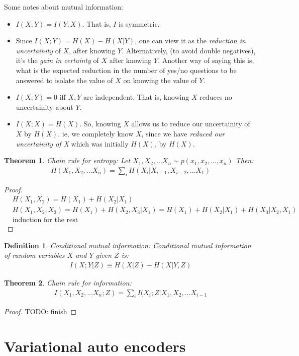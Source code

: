 \documentclass[11pt]{book}
\renewcommand{\H}{\ensuremath{H}}
\newcommand{\I}{\ensuremath{I}}
\newtheorem{theorem}{Theorem}
\newtheorem{definition}{Definition}
\newtheorem{proof}{Proof}
\begin{document}
Some notes about mutual information:
\begin{itemize}
    \item $I(X; Y) = I(Y;X)$. That is, $I$ is symmetric.

    \item Since $I(X;Y) = H(X) - H(X|Y)$, one can view it as the 
         \textit{reduction in uncertainity} of $X$, after knowing $Y$. 
         Alternatively, (to avoid double negatives), it's the \textit{gain in
         certainty} of $X$ after knowing $Y$.  Another way of saying this is,
         what is the expected reduction in the number of yes/no questions to be
         answered to isolate the value of $X$ on knowing the value of $Y$.

    \item $I(X;Y) = 0$ iff $X, Y$ are independent. That is, knowing $X$ reduces
        no uncertainity about $Y$.

    \item $I(X;X) = H(X)$. So, knowing $X$ allows us to reduce our uncertainity
        of $X$ by $H(X)$. ie, we completely know $X$, since we have
        \textit{reduced our uncertainity of X} which was initially $H(X)$, by $H(X)$.

\end{itemize}

\begin{theorem}
    Chain rule for entropy: Let $X_1, X_2, \dots X_n \sim p(x_1, x_2, \dots, x_n)$
    Then:
    \begin{align*}
        \H(X_1, X_2, \dots X_n) = \sum_i \H(X_i | X_{i-1}, X_{i-2}, \dots X_1)
    \end{align*}
\end{theorem}
\begin{proof}
    \begin{align*}
    &\H(X_1, X_2) = \H(X_1) + \H(X_2 | X_1) \\
    &\H(X_1, X_2, X_3) = \H(X_1) + \H(X_2, X_3 | X_1) = \H(X_1) + H(X_2 | X_1) + H(X_3 | X_2, X_1) \\
    &\text{induction for the rest}
    \end{align*}
\end{proof}

\begin{definition}
    Conditional mutual information: Conditional mutual information of random
    variables $X$ and $Y$ given $Z$ is:
    \begin{align*}
        \I(X; Y | Z) \equiv \H(X|Z) - \H(X|Y, Z)
    \end{align*}
\end{definition}

\begin{theorem}
    Chain rule for information:
    \begin{align*}
        \I(X_1, X_2, \dots X_n ; Z) = \sum_i I(X_i ; Z | X_1, X_2, \dots X_{i - 1}
    \end{align*}
\end{theorem}
\begin{proof}
    TODO: finish
\end{proof}

\chapter{Variational auto encoders}
\end{document}
